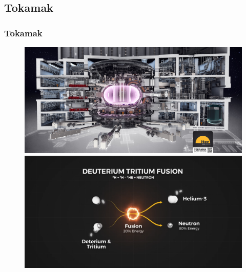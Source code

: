 \documentclass{beamer}
\begin{document}
\subsection{Tokamak}
\begin{frame}
    \frametitle{Tokamak}
    \begin{figure}
        \includegraphics[scale=0.043]{iter.jpeg}
        \includegraphics[scale=0.135]{deut_trit_v2.png}
    \end{figure} 
\end{frame}
\end{document}
